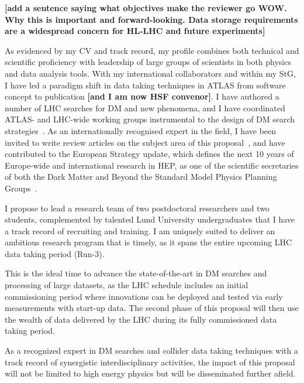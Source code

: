 \documentclass[11pt,a4paper]{article}
\begin{document}
\textbf{[add a sentence saying what objectives make the reviewer go WOW. Why this is important and forward-looking. Data storage requirements are a widespread concern for HL-LHC and future experiments]}

As evidenced by my CV and track record, my profile combines both technical and scientific proficiency with leadership of large groups of scientists in both physics and data analysis tools. 
With my international collaborators and within my StG, I have led a paradigm shift in data taking techniques in ATLAS from software concept to publication \textbf{[and I am now HSF convenor]}. I have authored a number of LHC searches for DM and new phenomena, and I have coordinated ATLAS- and LHC-wide working groups instrumental to the design of DM search strategies~\cite{DMWG}. 
As an internationally recognised expert in the field, I have been invited to write review articles on the subject area of this proposal~\cite{Buchmueller:2017qhf, Boveia:2018yeb}, and have contributed to the European Strategy update, which defines the next 10 years of Europe-wide and international research in HEP, as one of the scientific secretaries of both the Dark Matter and Beyond the Standard Model Physics Planning Groups~\cite{Strategy:2019vxc}.

I propose to lead a research team of two postdoctoral researchers and two students, complemented by talented Lund University undergraduates that I have a track record of recruiting and training. I am uniquely suited to deliver an ambitious research program that is timely, as it spans the entire upcoming LHC data taking period (Run-3). 

This is the ideal time to advance the state-of-the-art in DM searches and processing of large datasets, as the LHC schedule includes an initial commissioning period where innovations can be deployed and tested via early measurements with start-up data. The  second phase of this proposal will then use the wealth of data delivered by the LHC during its fully commissioned data taking period. 


As a recognized expert in DM searches and collider data taking techniques with a track record of synergistic interdisciplinary activities, the impact of this proposal will not be limited to high energy physics but will be disseminated further afield.  
\end{document}
